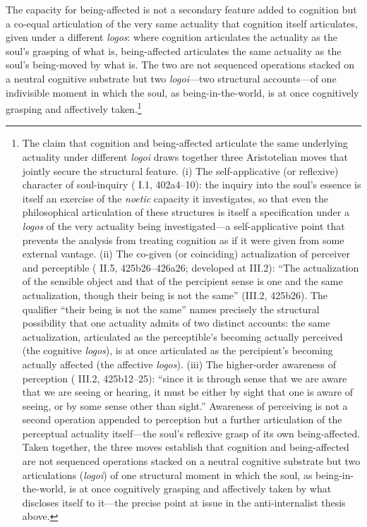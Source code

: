 
The capacity for being-affected is not a secondary feature added to cognition but a co-equal articulation of the very same actuality that cognition itself articulates, given under a different \textit{logos}: where cognition articulates the actuality as the soul's grasping of what is, being-affected articulates the same actuality as the soul's being-moved by what is. The two are not sequenced operations stacked on a neutral cognitive substrate but two \textit{logoi}---two structural accounts---of one indivisible moment in which the soul, as being-in-the-world, is at once cognitively grasping and affectively taken.\footnote{The claim that cognition and being-affected articulate the same underlying actuality under different \textit{logoi} draws together three Aristotelian moves that jointly secure the structural feature. (i) The self-applicative (or reflexive) character of soul-inquiry (\cite{aristotle2014soul} I.1, 402a4--10): the inquiry into the soul's essence is itself an exercise of the \textit{noetic} capacity it investigates, so that even the philosophical articulation of these structures is itself a specification under a \textit{logos} of the very actuality being investigated---a self-applicative point that prevents the analysis from treating cognition as if it were given from some external vantage. (ii) The co-given (or coinciding) actualization of perceiver and perceptible (\cite{aristotle2014soul} II.5, 425b26--426a26; developed at III.2): ``The actualization of the sensible object and that of the percipient sense is one and the same actualization, though their being is not the same'' (III.2, 425b26). The qualifier ``their being is not the same'' names precisely the structural possibility that one actuality admits of two distinct accounts: the same actualization, articulated as the perceptible's becoming actually perceived (the cognitive \textit{logos}), is at once articulated as the percipient's becoming actually affected (the affective \textit{logos}). (iii) The higher-order awareness of perception (\cite{aristotle2014soul} III.2, 425b12--25): ``since it is through sense that we are aware that we are seeing or hearing, it must be either by sight that one is aware of seeing, or by some sense other than sight.'' Awareness of perceiving is not a second operation appended to perception but a further articulation of the perceptual actuality itself---the soul's reflexive grasp of its own being-affected. Taken together, the three moves establish that cognition and being-affected are not sequenced operations stacked on a neutral cognitive substrate but two articulations (\textit{logoi}) of one structural moment in which the soul, as being-in-the-world, is at once cognitively grasping and affectively taken by what discloses itself to it---the precise point at issue in the anti-internalist thesis above.}
